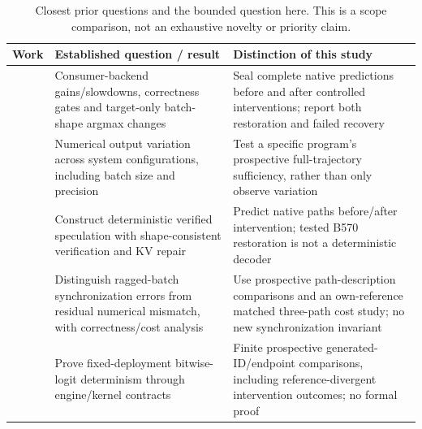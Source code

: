 \begin{table}[t]
\caption{Closest prior questions and the bounded question here. This is a scope comparison, not an exhaustive novelty or priority claim.}
\label{tab:nearestwork}
\centering
\begin{tabular}{@{}>{\raggedright\arraybackslash}p{1.48in}>{\raggedright\arraybackslash}p{2.27in}>{\raggedright\arraybackslash}p{2.35in}@{}}
\toprule
Work & Established question / result & Distinction of this study \\
\midrule
\citet{lossless} & Consumer-backend gains/slowdowns, correctness gates and target-only batch-shape argmax changes & Seal complete native predictions before and after controlled interventions; report both restoration and failed recovery \\
\citet{numerics} & Numerical output variation across system configurations, including batch size and precision & Test a specific program's prospective full-trajectory sufficiency, rather than only observe variation \\
\citet{llm42} & Construct deterministic verified speculation with shape-consistent verification and KV repair & Predict native paths before/after intervention; tested B570 restoration is not a deterministic decoder \\
\citet{batchcorrect} & Distinguish ragged-batch synchronization errors from residual numerical mismatch, with correctness/cost analysis & Use prospective path-description comparisons and an own-reference matched three-path cost study; no new synchronization invariant \\
\citet{vosti} & Prove fixed-deployment bitwise-logit determinism through engine/kernel contracts & Finite prospective generated-ID/endpoint comparisons, including reference-divergent intervention outcomes; no formal proof \\
\bottomrule
\end{tabular}
\end{table}
